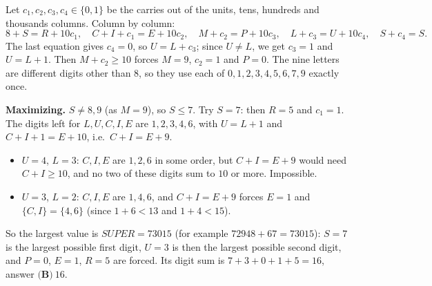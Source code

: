 Let $c_1,c_2,c_3,c_4\in\{0,1\}$ be the carries out of the units, tens, hundreds and thousands columns. Column by column:
\[
8+S=R+10c_1,\quad C+I+c_1=E+10c_2,\quad M+c_2=P+10c_3,\quad L+c_3=U+10c_4,\quad S+c_4=S .
\]
The last equation gives $c_4=0$, so $U=L+c_3$; since $U\ne L$, we get $c_3=1$ and $U=L+1$. Then $M+c_2\ge10$ forces $M=9$, $c_2=1$ and $P=0$. The nine letters are different digits other than $8$, so they use each of $0,1,2,3,4,5,6,7,9$ exactly once.

\textbf{Maximizing.} $S\ne8,9$ (as $M=9$), so $S\le7$. Try $S=7$: then $R=5$ and $c_1=1$. The digits left for $L,U,C,I,E$ are $1,2,3,4,6$, with $U=L+1$ and $C+I+1=E+10$, i.e.\ $C+I=E+9$.
\begin{itemize}
\item $U=4$, $L=3$: $C,I,E$ are $1,2,6$ in some order, but $C+I=E+9$ would need $C+I\ge10$, and no two of these digits sum to $10$ or more. Impossible.
\item $U=3$, $L=2$: $C,I,E$ are $1,4,6$, and $C+I=E+9$ forces $E=1$ and $\{C,I\}=\{4,6\}$ (since $1+6<13$ and $1+4<15$).
\end{itemize}
So the largest value is $SUPER=73015$ (for example $72948+67=73015$): $S=7$ is the largest possible first digit, $U=3$ is then the largest possible second digit, and $P=0$, $E=1$, $R=5$ are forced. Its digit sum is $7+3+0+1+5=16$, answer $\boxed{\textbf{(B)}\ 16}$.
